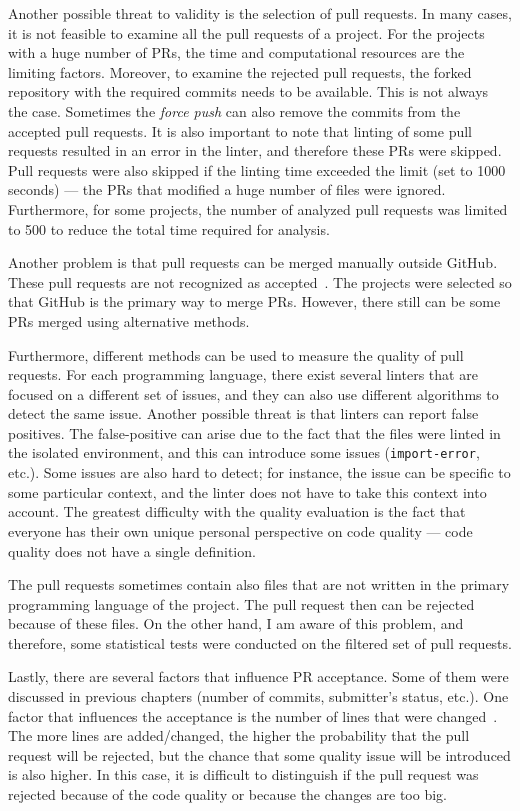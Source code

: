 \documentclass[digital,oneside,oldtable,nolof,nolot,nocover]{fithesis4}
\begin{document}
Another possible threat to validity is the selection of pull requests.
In many cases, it is not feasible to examine all the pull requests of a project.
For the projects with a huge number of PRs, the time and computational resources are
the limiting factors. Moreover, to examine the rejected pull requests, the forked
repository with the required commits needs to be available. This is not always the case.
Sometimes the \emph{force push} can also remove the commits from the accepted pull requests.
It is also important to note that linting of some pull requests resulted in an error in the
linter, and therefore these PRs were skipped. Pull requests were also skipped if the
linting time exceeded the limit (set to 1000 seconds) --- the PRs that
modified a huge number of files were ignored. Furthermore, for some projects,
the number of analyzed pull requests was limited to 500 to reduce the total
time required for analysis.

Another problem is that pull requests can be merged manually outside GitHub.
These pull requests are not recognized as accepted~\cite{ghperils}. The projects were selected so that
GitHub is the primary way to merge PRs. However, there still can be some PRs
merged using alternative methods.

Furthermore, different methods can be used to measure the quality of pull
requests. For each programming language, there exist several linters that
are focused on a different set of issues, and they can also use different algorithms
to detect the same issue. Another possible threat is that linters can report false positives.
The false-positive can arise due to the fact that the files were linted in the
isolated environment, and this can introduce some issues (\texttt{import-error}, etc.).
Some issues are also hard to detect; for instance, the issue can be specific to
some particular context, and the linter does not have to take this context into
account. The greatest difficulty with the quality evaluation is the fact that
everyone has their own unique personal perspective on code quality --- code quality
does not have a single definition.

The pull requests sometimes contain also files that are not written in the
primary programming language of the project. The pull request then can be
rejected because of these files. On the other hand, I am aware of this problem,
and therefore, some statistical tests were conducted on the filtered set of pull requests.

Lastly, there are several factors that influence PR acceptance.
Some of them were discussed in previous chapters (number of commits, submitter's status, etc.).
One factor that influences the acceptance is the number of lines that were changed~\cite{social}.
The more lines are added/changed, the higher the probability that the pull request will be
rejected, but the chance that some quality issue will be introduced is also higher.
In this case, it is difficult to distinguish if the pull request was rejected because
of the code quality or because the changes are too big.
\end{document}
